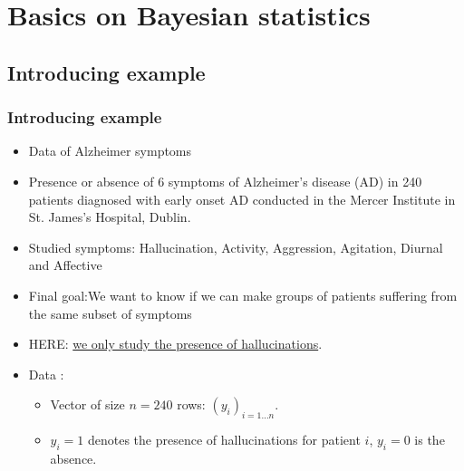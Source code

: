 \section[Basics]{Basics on Bayesian statistics}

\subsection{Introducing example}
\begin{frame}\frametitle{Introducing example}\label{Introduction}
\hyperlink{basics probability}{}



\begin{itemize}
\item Data of Alzheimer symptoms \cite{Moran2004}
\item Presence or absence of 6 symptoms of Alzheimer's disease (AD) in 240 patients diagnosed with early onset AD conducted in the Mercer Institute in St. James's Hospital, Dublin.
\item \vert Studied symptoms\noir: Hallucination, Activity, Aggression, Agitation, Diurnal and Affective
\item \vert Final goal:\noir We want to know if we can make groups of patients suffering from the same subset of symptoms
\item\vert  HERE: \noir  \underline{we only study the presence of hallucinations}. 
\item \vert Data  \noir : 
\begin{itemize}
\item Vector of size  $n=240$ rows:   $(y_{i})_{i=1\dots n}$. 
\item $y_i=1$ denotes the presence of   hallucinations for patient $i$,  $y_i=0$ is the absence.
\end{itemize}


\end{itemize}
\end{frame}

